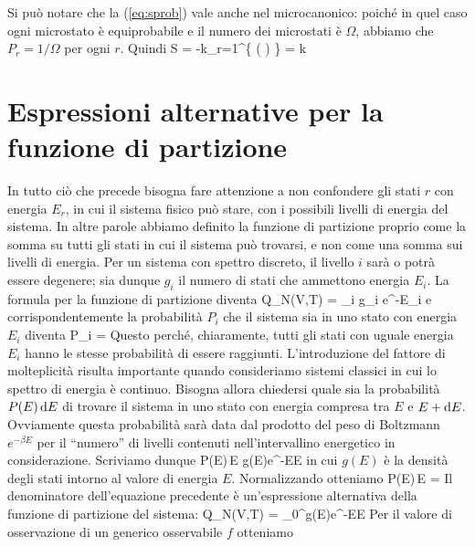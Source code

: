 Si può notare che la (\ref{eq:sprob}) vale anche nel microcanonico: poiché in quel caso ogni microstato è equiprobabile e il numero dei microstati è $\Omega$, abbiamo che $P_r = 1/\Omega$ per ogni $r$. Quindi
\be
S = -k\sum_{r=1}^\Omega\left\{ \ln\left(  \right) \right\} = k\ln\Omega
\ee

\section{Espressioni alternative per la funzione di partizione}

In tutto ciò che precede bisogna fare attenzione a non confondere gli stati $r$ con energia $E_r$, in cui il sistema fisico può stare, con i possibili livelli di energia del sistema. In altre parole abbiamo definito la funzione di partizione proprio come la somma su tutti gli stati in cui il sistema può trovarsi, e non come una somma sui livelli di energia. Per un sistema con spettro discreto, il livello $i$ sarà o potrà essere degenere; sia dunque $g_i$ il numero di stati che ammettono energia $E_i$. La formula per la funzione di partizione diventa
\be
Q_N(V,T) = \sum_i g_i e^{-\beta E_i}
\ee
e corrispondentemente la probabilità $P_i$ che il sistema sia in uno stato con energia $E_i$ diventa
\be
P_i = 
\ee
Questo perché, chiaramente, tutti gli stati con uguale energia $E_i$ hanno le stesse probabilità di essere raggiunti.
L'introduzione del fattore di molteplicità risulta importante quando consideriamo sistemi classici in cui lo spettro di energia è continuo. Bisogna allora chiedersi quale sia la probabilità $P(E)\,{\textrm d}E$ di trovare il sistema in uno stato con energia compresa tra $E$ e $E + {\textrm d}E$. Ovviamente questa probabilità sarà data dal prodotto del peso di Boltzmann $e^{-\beta E}$ per il ``numero'' di livelli contenuti nell'intervallino energetico in considerazione. Scriviamo dunque
\be
P(E)\,\de E \propto g(E)e^{-\beta E}\de E
\ee
in cui $g(E)$ è la densità degli stati intorno al valore di energia $E$. Normalizzando otteniamo
\be
P(E)\,\de E = 
\ee
Il denominatore dell'equazione precedente è un'espressione alternativa della funzione di partizione del sistema:
\be
\label{eq:laplace}
Q_N(V,T) = \int_0^\infty g(E)e^{-\beta E}\de E
\ee
Per il valore di osservazione di un generico osservabile $f$ otteniamo
